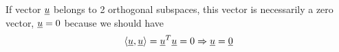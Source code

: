 \begin{note}
If vector $\underline{u}$ belongs to 2 orthogonal subspaces, this vector is necessarily a zero vector, $\underline{u} = 0$ because we should have 
\[
\langle\underline{u},\underline{u}\rangle = \underline{u}^T\underline{u} = 0\Rightarrow \underline{u} = \underline{0}
\]
\end{note}


























